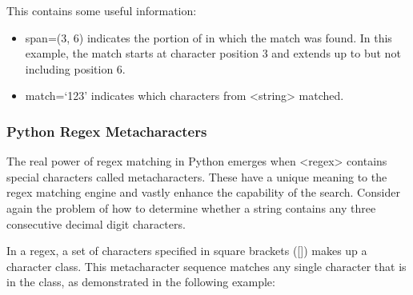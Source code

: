 \documentclass[11pt]{article}
\begin{document}
This contains some useful information:

\begin{itemize}
\item
  span=(3, 6) indicates the portion of in which the match was found. In
  this example, the match starts at character position 3 and extends up
  to but not including position 6.
\item
  match=`123' indicates which characters from
  \textless string\textgreater{} matched.
\end{itemize}

    \hypertarget{python-regex-metacharacters}{%
\subsubsection{Python Regex
Metacharacters}\label{python-regex-metacharacters}}

The real power of regex matching in Python emerges when
\textless regex\textgreater{} contains special characters called
metacharacters. These have a unique meaning to the regex matching engine
and vastly enhance the capability of the search. Consider again the
problem of how to determine whether a string contains any three
consecutive decimal digit characters.

In a regex, a set of characters specified in square brackets ({[}{]})
makes up a character class. This metacharacter sequence matches any
single character that is in the class, as demonstrated in the following
example:
\end{document}
